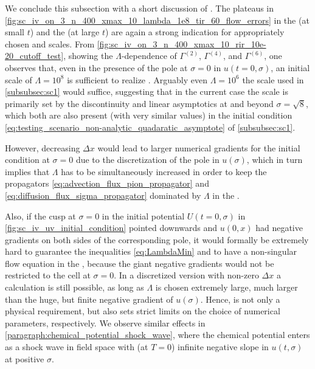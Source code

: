 We conclude this subsection with a short discussion of \rgcy{}.
The plateaus in \cref{fig:sc_iv_on_3_n_400_xmax_10_lambda_1e8_tir_60_flow_errors} in the \uv{} (at small $t$) and the \ir{} (at large $t$) are again a strong indication for appropriately chosen \uv{} and \ir{} scales.
From \cref{fig:sc_iv_on_3_n_400_xmax_10_rir_10e-20_cutoff_test}, showing the $\Lambda$-dependence of $\Gamma^{(2)}$, $\Gamma^{(4)}$, and $\Gamma^{(6)}$, one observes that, even in the presence of the pole at $\sigma = 0$ in ${u ( t = 0, \sigma )}$, an initial \uv{} scale of $\Lambda=10^8$ is sufficient to realize \rgcy{}. 
Arguably even $\Lambda=10^6$ \dash{} the scale used in \cref{subsubsec:sc1} \dash{} would suffice, suggesting that in the current case the scale is primarily set by the discontinuity and linear asymptotics at and beyond $\sigma = \sqrt{8}$, which both are also present (with very similar values) in the initial condition \eqref{eq:testing_scenario_non-analytic_quadaratic_asymptote} of \cref{subsubsec:sc1}.

However, decreasing $\Delta x$ would lead to larger numerical gradients for the initial condition at $\sigma = 0$ due to the discretization of the pole in $u(\sigma)$, which in turn implies that $\Lambda$ has to be simultaneously increased in order to keep the propagators \eqref{eq:advection_flux_pion_propagator} and \eqref{eq:diffusion_flux_sigma_propagator} dominated by $\Lambda$ in the \uv{}.

Also, if the cusp at $\sigma = 0$ in the \uv{} initial potential $U ( t = 0, \sigma )$ in \cref{fig:sc_iv_uv_initial_condition} pointed downwards and $u ( 0, x )$ had negative gradients on both sides of the corresponding pole, it would formally be extremely hard to guarantee the inequalities \eqref{eq:LambdaMin} and to have a non-singular flow equation in the \uv{}, because the giant negative gradients would not be restricted to the cell at $\sigma = 0$.
In a discretized version with non-zero $\Delta x$ a calculation is still possible, as long as $\Lambda$ is chosen extremely large, much larger than the huge, but finite negative gradient of $u(\sigma)$.
Hence, \rgcy{} is not only a physical requirement, but also sets strict limits on the choice of numerical parameters, respectively.
We observe similar effects in \cref{paragraph:chemical_potential_shock_wave}, where the chemical potential enters as a shock wave in field space with (at $T=0$) infinite negative slope in $u(t,\sigma)$ at positive $\sigma$.